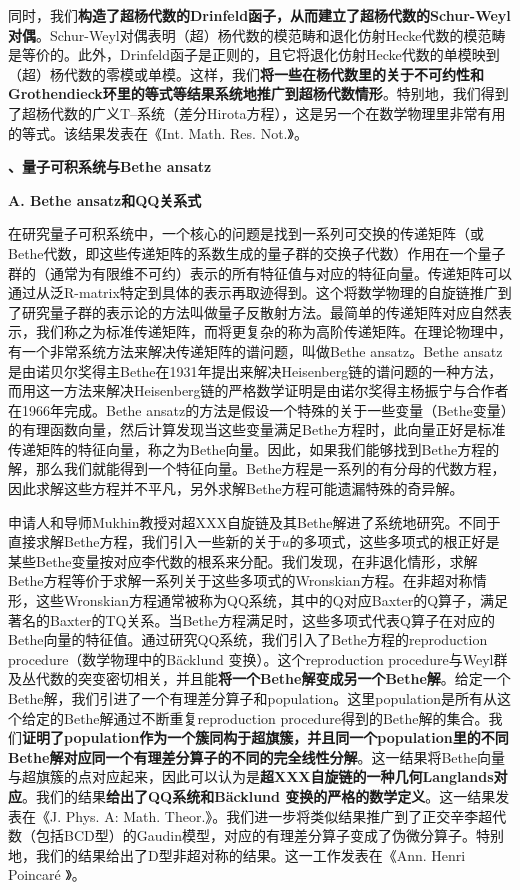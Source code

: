 \documentclass[12pt,UTF8,AutoFakeBold=4,a4paper]{ctexart}
\begin{document}
同时，我们\textbf{构造了超杨代数的Drinfeld函子，从而建立了超杨代数的Schur-Weyl对偶}。Schur-Weyl对偶表明（超）杨代数的模范畴和退化仿射Hecke代数的模范畴是等价的。此外，Drinfeld函子是正则的，且它将退化仿射Hecke代数的单模映到（超）杨代数的零模或单模。这样，我们\textbf{将一些在杨代数里的关于不可约性和Grothendieck环里的等式等结果系统地推广到超杨代数情形}。特别地，我们得到了超杨代数的广义T--系统（差分Hirota方程），这是另一个在数学物理里非常有用的等式。该结果发表在《Int. Math. Res. Not.》。


\medskip

\textbf{、量子可积系统与Bethe ansatz}

\textbf{A. Bethe ansatz和QQ关系式}

在研究量子可积系统中，一个核心的问题是找到一系列可交换的传递矩阵（或Bethe代数，即这些传递矩阵的系数生成的量子群的交换子代数）作用在一个量子群的（通常为有限维不可约）表示的所有特征值与对应的特征向量。传递矩阵可以通过从泛R-matrix特定到具体的表示再取迹得到。这个将数学物理的自旋链推广到了研究量子群的表示论的方法叫做量子反散射方法。最简单的传递矩阵对应自然表示，我们称之为标准传递矩阵，而将更复杂的称为高阶传递矩阵。在理论物理中，有一个非常系统方法来解决传递矩阵的谱问题，叫做Bethe ansatz。Bethe ansatz是由诺贝尔奖得主Bethe在1931年提出来解决Heisenberg链的谱问题的一种方法，而用这一方法来解决Heisenberg链的严格数学证明是由诺尔奖得主杨振宁与合作者在1966年完成。Bethe ansatz的方法是假设一个特殊的关于一些变量（Bethe变量）的有理函数向量，然后计算发现当这些变量满足Bethe方程时，此向量正好是标准传递矩阵的特征向量，称之为Bethe向量。因此，如果我们能够找到Bethe方程的解，那么我们就能得到一个特征向量。Bethe方程是一系列的有分母的代数方程，因此求解这些方程并不平凡，另外求解Bethe方程可能遗漏特殊的奇异解。

申请人和导师Mukhin教授对超XXX自旋链及其Bethe解进了系统地研究。不同于直接求解Bethe方程，我们引入一些新的关于$u$的多项式，这些多项式的根正好是某些Bethe变量按对应李代数的根系来分配。我们发现，在非退化情形，求解Bethe方程等价于求解一系列关于这些多项式的Wronskian方程。在非超对称情形，这些Wronskian方程通常被称为QQ系统，其中的Q对应Baxter的Q算子，满足著名的Baxter的TQ关系。当Bethe方程满足时，这些多项式代表Q算子在对应的Bethe向量的特征值。通过研究QQ系统，我们引入了Bethe方程的reproduction procedure（数学物理中的B\"{a}cklund 变换）。这个reproduction procedure与Weyl群及丛代数的突变密切相关，并且能\textbf{将一个Bethe解变成另一个Bethe解}。给定一个Bethe解，我们引进了一个有理差分算子和population。这里population是所有从这个给定的Bethe解通过不断重复reproduction procedure得到的Bethe解的集合。我们\textbf{证明了population作为一个簇同构于超旗簇，并且同一个population里的不同Bethe解对应同一个有理差分算子的不同的完全线性分解}。这一结果将Bethe向量与超旗簇的点对应起来，因此可以认为是\textbf{超XXX自旋链的一种几何Langlands对应}。我们的结果\textbf{给出了QQ系统和B\"{a}cklund 变换的严格的数学定义}。这一结果发表在《J. Phys. A: Math. Theor.》。我们进一步将类似结果推广到了正交辛李超代数（包括BCD型）的Gaudin模型，对应的有理差分算子变成了伪微分算子。特别地，我们的结果给出了D型非超对称的结果。这一工作发表在《Ann. Henri Poincaré 》。
\end{document}
